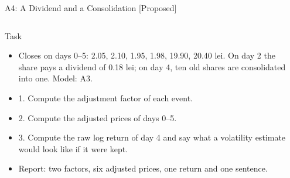 \begin{frame}{A4: A Dividend and a Consolidation [Proposed]}
\propsub
\itemsize{\footnotesize}
\begin{columns}[T]
\begin{column}{\taskw}
\begin{block}{Task}
\begin{itemize}
    \item Closes on days 0--5: 2.05, 2.10, 1.95, 1.98, 19.90, 20.40 lei. On day 2 the share pays a dividend of 0.18 lei; on day 4, ten old shares are consolidated into one. Model: A3.
    \item 1. Compute the adjustment factor of each event.
    \item 2. Compute the adjusted prices of days 0--5.
    \item 3. Compute the raw log return of day 4 and say what a volatility estimate would look like if it were kept.
    \item Report: two factors, six adjusted prices, one return and one sentence.
\end{itemize}
\end{block}
\end{column}
\begin{column}{\solw}
\end{column}
\end{columns}
\end{frame}

